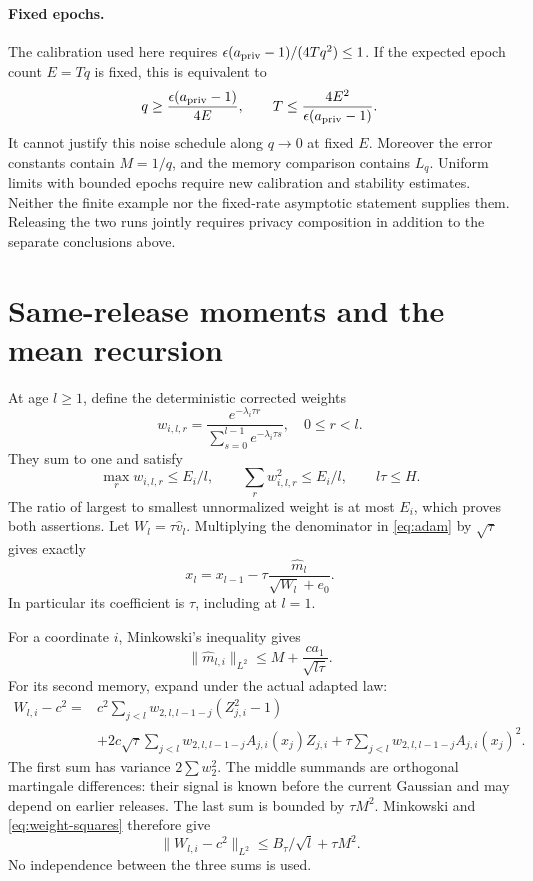 \documentclass[a4paper,11pt]{article}
\theoremstyle{remark}
\newcommand{\Ltwo}[1]{\lVert#1\rVert_{L^2}}
\begin{document}
\paragraph{Fixed epochs.}
The calibration used here requires
$\epsilon(a_{\rm priv}-1)/(4Tq^2)\le1$.
If the expected epoch count $E=Tq$ is fixed, this is equivalent to
\[
 q\ge\frac{\epsilon(a_{\rm priv}-1)}{4E},\qquad
 T\le\frac{4E^2}{\epsilon(a_{\rm priv}-1)}.
\]
It cannot justify this noise schedule along $q\to0$ at fixed $E$.
Moreover the error constants contain $M=1/q$, and the memory comparison
contains $L_q$. Uniform limits with bounded epochs require new calibration
and stability estimates. Neither the finite example nor the fixed-rate
asymptotic statement supplies them. Releasing the two runs jointly requires
privacy composition in addition to the separate conclusions above.

\appendix
\section{Same-release moments and the mean recursion}\label{app:moments}

At age $l\ge1$, define the deterministic corrected weights
\[
 w_{i,l,r}=\frac{e^{-\lambda_i\tau r}}
                  {\sum_{s=0}^{l-1}e^{-\lambda_i\tau s}},\quad 0\le r<l.
\]
They sum to one and satisfy
\begin{equation}\label{eq:weight-squares}
 \max_r w_{i,l,r}\le E_i/l,\qquad \sum_rw_{i,l,r}^2\le E_i/l,
 \qquad l\tau\le H.
\end{equation}
The ratio of largest to smallest unnormalized weight is at most $E_i$,
which proves both assertions. Let $W_l=\tau\widehat v_l$.
Multiplying the denominator in \eqref{eq:adam} by $\sqrt\tau$ gives exactly
\begin{equation}\label{eq:scaled-update}
 x_l=x_{l-1}-\tau\frac{\widehat m_l}{\sqrt{W_l}+e_0}.
\end{equation}
In particular its coefficient is $\tau$, including at $l=1$.

For a coordinate $i$, Minkowski's inequality gives
\begin{equation}\label{eq:first-L2}
 \Ltwo{\widehat m_{l,i}}\le M+\frac{ca_1}{\sqrt{l\tau}}.
\end{equation}
For its second memory, expand under the actual adapted law:
\begin{align*}
 W_{l,i}-c^2={}&c^2\sum_{j<l}w_{2,l,l-1-j}(Z_{j,i}^2-1)\\
 &+2c\sqrt\tau\sum_{j<l}w_{2,l,l-1-j}A_{j,i}(x_j)Z_{j,i}
 +\tau\sum_{j<l}w_{2,l,l-1-j}A_{j,i}(x_j)^2.
\end{align*}
The first sum has variance $2\sum w_2^2$. The middle summands are
orthogonal martingale differences: their signal is known before the current
Gaussian and may depend on earlier releases. The last sum is bounded by
$\tau M^2$. Minkowski and \eqref{eq:weight-squares} therefore give
\begin{equation}\label{eq:second-L2}
 \Ltwo{W_{l,i}-c^2}\le B_\tau/\sqrt l+\tau M^2.
\end{equation}
No independence between the three sums is used.
\end{document}
